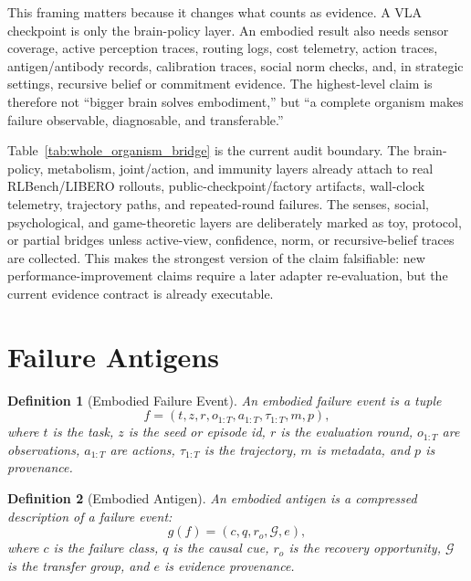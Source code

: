 \documentclass[11pt]{article}
\newtheorem{definition}{Definition}
\begin{document}
This framing matters because it changes what counts as evidence.
A VLA checkpoint is only the brain-policy layer.
An embodied result also needs sensor coverage, active perception traces, routing logs, cost telemetry, action traces, antigen/antibody records, calibration traces, social norm checks, and, in strategic settings, recursive belief or commitment evidence.
The highest-level claim is therefore not ``bigger brain solves embodiment,'' but ``a complete organism makes failure observable, diagnosable, and transferable.''

\begin{table}[t]
\centering
\scriptsize
\caption{Evidence bridge from Whole-Organism layers to existing artifacts. The bridge separates real rollout support from toy, protocol, and system-artifact support, so the paper can make strong claims without overstating performance evidence.}
\label{tab:whole_organism_bridge}

\end{table}

Table~\ref{tab:whole_organism_bridge} is the current audit boundary.
The brain-policy, metabolism, joint/action, and immunity layers already attach to real RLBench/LIBERO rollouts, public-checkpoint/factory artifacts, wall-clock telemetry, trajectory paths, and repeated-round failures.
The senses, social, psychological, and game-theoretic layers are deliberately marked as toy, protocol, or partial bridges unless active-view, confidence, norm, or recursive-belief traces are collected.
This makes the strongest version of the claim falsifiable: new performance-improvement claims require a later adapter re-evaluation, but the current evidence contract is already executable.

\section{Failure Antigens}

\begin{definition}[Embodied Failure Event]
An embodied failure event is a tuple
\[
f=(t,z,r,o_{1:T},a_{1:T},\tau_{1:T},m,p),
\]
where $t$ is the task, $z$ is the seed or episode id, $r$ is the evaluation round, $o_{1:T}$ are observations, $a_{1:T}$ are actions, $\tau_{1:T}$ is the trajectory, $m$ is metadata, and $p$ is provenance.
\end{definition}

\begin{definition}[Embodied Antigen]
An embodied antigen is a compressed description of a failure event:
\[
g(f)=(c, q, r_o, \mathcal{G}, e),
\]
where $c$ is the failure class, $q$ is the causal cue, $r_o$ is the recovery opportunity, $\mathcal{G}$ is the transfer group, and $e$ is evidence provenance.
\end{definition}
\end{document}
